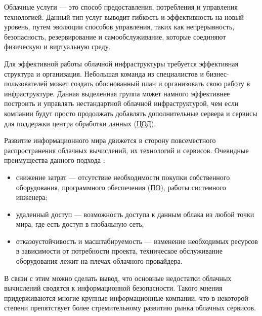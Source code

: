 
Облачные услуги --- это способ предоставления, потребления и управления технологией.
Данный тип услуг выводит гибкость и эффективность на новый уровень, путем эволюции способов управления, таких как непрерывность, безопасность, резервирование и самообслуживание, которые соединяют физическую и виртуальную среду.

Для эффективной работы облачной инфраструктуры требуется эффективная структура и организация.
Небольшая команда из специалистов и бизнес-пользователей может создать обоснованный план и организовать свою работу в инфраструктуре.
Данная выделенная группа может намного эффективнее построить и управлять нестандартной облачной инфраструктурой, чем если компании будут просто продолжать добавлять дополнительные сервера и сервисы для поддержки центра обработки данных (\hyperlink{dc}{ЦОД}).

Развитие информационного мира движется в сторону повсеместного распространения облачных вычислений, их технологий и сервисов.
Очевидные преимущества данного подхода \cite{telecom-world}:
\begin{itemize}
  \item снижение затрат --- отсутствие необходимости покупки собственного оборудования, программного обеспечения (\hyperlink{soft}{ПО}), работы системного инженера;
  \item удаленный доступ --- возможность доступа к данным облака из любой точки мира, где есть доступ в глобальную сеть;
  \item отказоустойчивость и масштабируемость --- изменение необходимых ресурсов в зависимости от потребности проекта, техническое обслуживание оборудования лежит на плечах облачного провайдера.
\end{itemize}

В связи с этим можно сделать вывод, что основные недостатки облачных вычислений сводятся к информационной безопасности.
Такого мнения придерживаются многие крупные информационные компании, что в некоторой степени препятствует более стремительному развитию рынка облачных сервисов.

\clearpage
